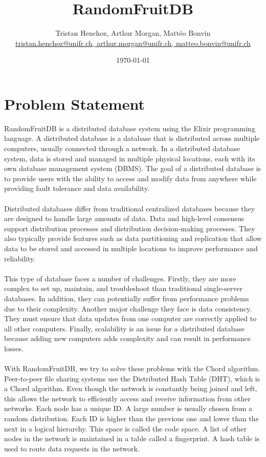 \documentclass{article}
\newcommand{\mail}[1]{{\href{mailto:#1}{#1}}}
\begin{document}
\title{RandomFruitDB}
\author{Tristan Henchoz, Arthur Morgan, Mattéo Bonvin
	\\ {\small\mail{tristan.henchoz@unifr.ch, arthur.morgan@unifr.ch, matteo.bonvin@unifr.ch}}}
\date{\today}

\maketitle
\tableofcontents
\pagebreak


\section{Problem Statement}
RandomFruitDB is a distributed database system using the Elixir programming language. A distributed database is a database that is distributed across multiple computers, usually connected through a network. In a distributed database system, data is stored and managed in multiple physical locations, each with its own database management system (DBMS). The goal of a distributed database is to provide users with the ability to access and modify data from anywhere while providing fault tolerance and data availability.
\\\\
Distributed databases differ from traditional centralized databases because they are designed to handle large amounts of data. Data and high-level consensus support distribution processes and distribution decision-making processes. They also typically provide features such as data partitioning and replication that allow data to be stored and accessed in multiple locations to improve performance and reliability.
\\\\
This type of database faces a number of challenges. Firstly, they are more complex to set up, maintain, and troubleshoot than traditional single-server databases. In addition, they can potentially suffer from performance problems due to their complexity. Another major challenge they face is data consistency. They must ensure that data updates from one computer are correctly applied to all other computers. Finally, scalability is an issue for a distributed database because adding new computers adds complexity and can result in performance losses.
\\\\
With RandomFruitDB, we try to solve these problems with the Chord algorithm. Peer-to-peer file sharing systems use the Distributed Hash Table (DHT), which is a Chord algorithm. Even though the network is constantly being joined and left, this allows the network to efficiently access and receive information from other networks. Each node has a unique ID. A large number is usually chosen from a random distribution. Each ID is higher than the previous one and lower than the next in a logical hierarchy. This space is called the code space. A list of other nodes in the network is maintained in a table called a fingerprint. A hash table is used to route data requests in the network.
\end{document}
